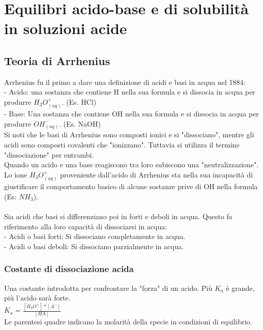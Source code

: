 \section{Equilibri acido-base e di solubilità in soluzioni acide}
\subsection{Teoria di Arrhenius}
Arrhenius fu il primo a dare una definizione di acidi e basi in acqua nel 1884:\\
\tab- Acido: una sostanza che contiene H nella sua formula e si dissocia in acqua per produrre $H_3O^+_{(aq)}$. (Es. HCl)\\
\tab- Base: Una sostanza che contiene OH nella sua formula e si dissocia in acqua per produrre $OH^-_{(aq)}$. (Es. NaOH)\\
Si noti che le basi di Arrhenius sono composti ionici e si "dissociano", mentre gli acidi sono composti covalenti che "ionizzano". Tuttavia si utilizza il termine "dissociazione" per entrambi.\\
Quando un acido e una base reagiscono tra loro subiscono una "neutralizzazione". Lo ione $H_3O^+_{(aq)}$ proveniente dall'acido di Arrhenius sta nella sua incapacità di giustificare il comportamento basico di alcune sostanze prive di OH nella formula (Es: $NH_3$).\\\\
Sia acidi che basi si differenziano poi in forti e deboli in acqua. Questo fa riferimento alla loro capacità di dissociarsi in acqua:\\
\tab- Acidi o basi forti: Si dissociano completamente in acqua.\\
\tab- Acidi o basi deboli: Si dissociano parzialmente in acqua.\\
\subsubsection{Costante di dissociazione acida}
Una costante introdotta per confrontare la "forza" di un acido. Più $K_a$ è grande, più l'acido sarà forte.\\
$K_a = \frac{[H_3O^+]*[A^-]}{[HA]}$\\
Le parentesi quadre indicano la molarità della specie in condizioni di equilibrio.\\
